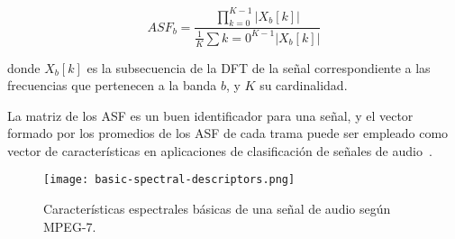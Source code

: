 \begin{equation}
    \label{eq:ASF}
    ASF_b = \frac{\prod_{k=0}^{K-1}{|X_{b}[k]|}}{\frac{1}{K}\sum{k=0}^{K-1}{|X_{b}[k]|}}
\end{equation}

\noindent
donde $X_{b}[k]$ es la subsecuencia de la DFT de la señal correspondiente a las frecuencias que pertenecen a la banda $b$, y $K$ su cardinalidad.

La matriz de los ASF es un buen identificador para una señal, y el vector formado por los promedios de los ASF de cada trama puede ser empleado como vector de características en aplicaciones de clasificación de señales de audio~\cite{Kim05}.

\begin{figure}[!h]
    \centering
    \texttt{[image: basic-spectral-descriptors.png]}
    \caption{Características espectrales básicas de una señal de audio según MPEG-7.}
    \label{img:basic-spectral-descriptors}
\end{figure}